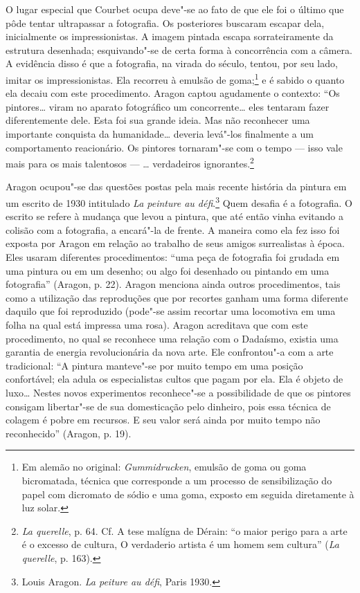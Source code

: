 O lugar especial que Courbet ocupa deve"-se ao fato de que ele foi o
último que pôde tentar ultrapassar a fotografia. Os posteriores buscaram
escapar dela, inicialmente os impressionistas. A imagem pintada escapa
sorrateiramente da estrutura desenhada; esquivando"-se de certa forma à
concorrência com a câmera. A evidência disso é que a fotografia, na
virada do século, tentou, por seu lado, imitar os impressionistas. Ela
recorreu à emulsão de goma;\footnote{Em alemão no original:
  \emph{Gummidrucken}, emulsão de goma ou goma bicromatada, técnica que
  corresponde a um processo de sensibilização do papel com dicromato de
  sódio e uma goma, exposto em seguida diretamente à luz solar. \versal{[N. T.]}} e é
sabido o quanto ela decaiu com este procedimento. Aragon captou
agudamente o contexto: ``Os pintores\ldots{} viram no aparato fotográfico um
concorrente\ldots{} eles tentaram fazer diferentemente dele. Esta foi sua
grande ideia. Mas não reconhecer uma importante conquista da humanidade\ldots{} deveria levá"-los finalmente a um comportamento reacionário. Os
pintores tornaram"-se com o tempo --- isso vale mais para os mais
talentosos --- \ldots{} verdadeiros ignorantes.\footnote{\emph{La querelle}, p.
  64. Cf. A tese malígna de Dérain: ``o maior perigo para a arte é o
  excesso de cultura, O verdaderio artista é um homem sem cultura''
  (\emph{La querelle}, p. 163).}

Aragon ocupou"-se das questões postas pela mais recente história da
pintura em um escrito de 1930 intitulado \emph{La peinture au
défi}.\footnote{Louis Aragon. \emph{La peiture au défi}, Paris 1930.}
Quem desafia é a fotografia. O escrito se refere à mudança que levou a
pintura, que até então vinha evitando a colisão com a fotografia, a
encará"-la de frente. A maneira como ela fez isso foi exposta por Aragon
em relação ao trabalho de seus amigos surrealistas à época. Eles usaram
diferentes procedimentos: ``uma peça de fotografia foi grudada em uma
pintura ou em um desenho; ou algo foi desenhado ou pintando em uma
fotografia'' (Aragon, p. 22). Aragon menciona ainda outros
procedimentos, tais como a utilização das reproduções que por recortes
ganham uma forma diferente daquilo que foi reproduzido (pode"-se assim
recortar uma locomotiva em uma folha na qual está impressa uma rosa).
Aragon acreditava que com este procedimento, no qual se reconhece uma
relação com o Dadaísmo, existia uma garantia de energia revolucionária
da nova arte. Ele confrontou"-a com a arte tradicional: ``A pintura
manteve"-se por muito tempo em uma posição confortável; ela adula os
especialistas cultos que pagam por ela. Ela é objeto de luxo\ldots{} Nestes
novos experimentos reconhece"-se a possibilidade de que os pintores
consigam libertar"-se de sua domesticação pelo dinheiro, pois essa
técnica de colagem é pobre em recursos. E seu valor será ainda por muito
tempo não reconhecido'' (Aragon, p. 19).


